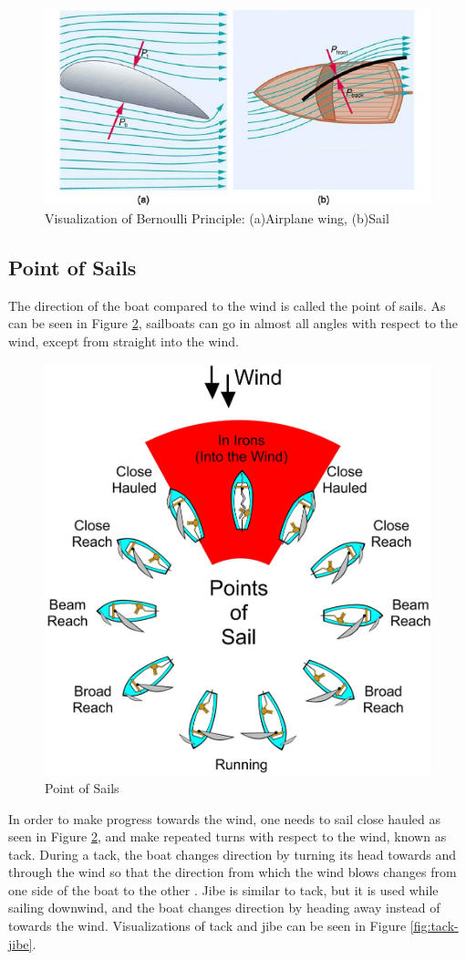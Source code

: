 \documentclass[12pt,twoside]{report}
\begin{document}
\begin{figure}[h]
\centering
\includegraphics[width = 0.6\hsize]{figures/sailing/sail-bernoulli.jpg}
\caption{Visualization of Bernoulli Principle: (a)Airplane wing, (b)Sail \cite{bernoulli}}
\label{fig:bernoulli}
\end{figure}

\subsection{Point of Sails}
The direction of the boat compared to the wind is called the point of sails. As can be seen in Figure \ref{fig:points-of-sail}, sailboats can go in almost all angles with respect to the wind, except from straight into the wind.

\begin{figure}[h]
\centering
\includegraphics[width = 0.55\hsize]{figures/sailing/PointsOfSail.png}
\caption{Point of Sails \cite{img:sailing-tack-gybe}}
\label{fig:points-of-sail}
\end{figure}

In order to make progress towards the wind, one needs to sail close hauled as seen in Figure \ref{fig:points-of-sail}, and make repeated turns with respect to the wind, known as tack. During a tack, the boat changes direction by turning its head towards and through the wind so that the direction from which the wind blows changes from one side of the boat to the other \cite{wiki:tack}. Jibe is similar to tack, but it is used while sailing downwind, and the boat changes direction by heading away instead of towards the wind. Visualizations of tack and jibe can be seen in Figure \ref{fig:tack-jibe}. 
\end{document}
